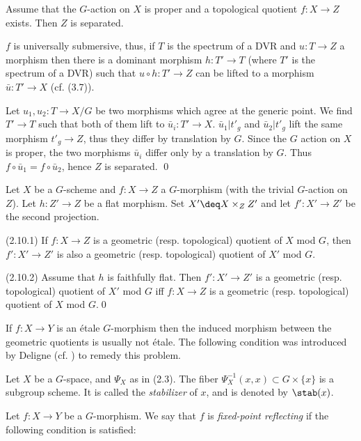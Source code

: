  Assume  that the $G$-action on $X$ is proper
and a topological quotient $f:X\to Z$ exists.
 Then $Z$ is separated.
\endproclaim

\demop    $f$ is universally submersive, thus, if $T$ is the
spectrum of a DVR and
$u:T\to Z$  a morphism then there is  a  dominant morphism $h:T'\to T$
(where
$T'$ is the spectrum of a DVR) such that $u\circ h:T'\to Z$ can be lifted to
a morphism $\bar u:T'\to X$ (cf. (3.7)).

Let $u_1,u_2:T\to X/G$ be two morphisms which agree at the generic point.
We find $T'\to T$ such that both of them lift to $\bar u_i:T'\to X$.
$\bar u_1|t'_g$ and $\bar u_2|t'_g$ lift the same morphism $t'_g\to Z$, thus
they differ by translation by $G$.  Since
the $G$ action on $X$ is proper, the two morphisms $\bar u_i$ differ only by
a translation by $G$. Thus $f\circ \bar u_1=f\circ \bar u_2$, hence $Z$ is
separated.
\qed\enddemo



 \cite{Mumford-Fogarty82, p.9} Let $X$ be a
$G$-scheme and $f:X\to Z$ a $G$-morphism (with the  trivial $G$-action on
$Z$). Let $h:Z'\to Z$ be a flat morphism. Set $X'\deq X\times_ZZ'$ and let
$f':X'\to Z'$  be the second projection.

(2.10.1) If $f:X\to Z$ is a
  geometric (resp. topological) quotient of  $X$ mod $G$, then
$f':X'\to Z'$ is also a geometric  (resp. topological) quotient of  $X'$ mod
$G$.

(2.10.2) Assume that $h$ is faithfully flat. Then  $f':X'\to Z'$ is a
  geometric (resp. topological) quotient of  $X'$ mod $G$ iff
$f:X\to Z$ is   a geometric  (resp. topological) quotient of  $X$ mod $G$.\qed
\endproclaim








If $f:X\to Y$ is an \'etale $G$-morphism then the induced morphism
between the geometric quotients is usually not \'etale. The following
condition was introduced by Deligne (cf. \cite{Knutson71, p. 183})
to remedy this problem.



  Let $X$ be a $G$-space, and $\Psi_X$ as in (2.3).
The fiber   $\Psi_X^{-1}(x,x)\subset G\times \{x\}$ is a subgroup scheme. It
is  called the {\it stabilizer} of $x$, and is denoted by $\stab(x)$.
\enddemo




  Let $f:X\to Y$ be a
$G$-morphism. We say that $f$ is {\it fixed-point reflecting}  if the
following condition is satisfied:

